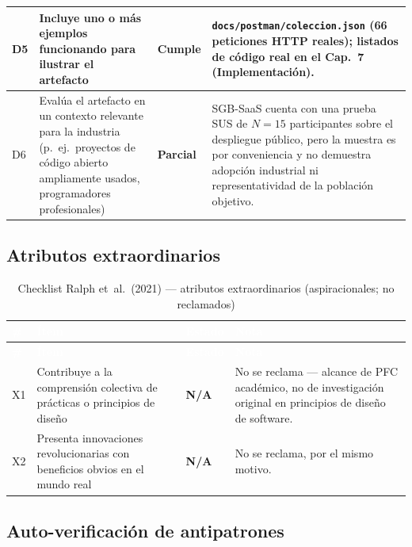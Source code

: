 \begin{center}
\begin{longtable}{|p{0.7cm}|p{4.2cm}|p{1.6cm}|p{7.0cm}|}
\hline
D5 & Incluye uno o más ejemplos funcionando para ilustrar el artefacto & \textbf{Cumple} & \texttt{docs/postman/coleccion.json} (66 peticiones HTTP reales); listados de código real en el Cap.\ 7 (Implementación). \\
\hline
D6 & Evalúa el artefacto en un contexto relevante para la industria (p.\ ej.\ proyectos de código abierto ampliamente usados, programadores profesionales) & \textbf{Parcial} & SGB-SaaS cuenta con una prueba SUS de $N=15$ participantes sobre el despliegue público, pero la muestra es por conveniencia y no demuestra adopción industrial ni representatividad de la población objetivo. \\
\hline
\end{longtable}
\end{center}

\subsection{Atributos extraordinarios}

\begin{center}
\scriptsize
\renewcommand{\arraystretch}{1.15}
\begin{longtable}{|p{0.7cm}|p{4.2cm}|p{1.6cm}|p{7.0cm}|}
\caption{Checklist Ralph et~al.\ (2021) --- atributos extraordinarios
  (aspiracionales; no reclamados)}
\label{tab:anexo-ralph-extraordinarios}\\
\hline
\rowcolor{verdeuteq}
\textcolor{white}{\textbf{\#}} &
\textcolor{white}{\textbf{Ítem}} &
\textcolor{white}{\textbf{Estado}} &
\textcolor{white}{\textbf{Nota}} \\
\hline
\endfirsthead
\hline
\rowcolor{verdeuteq}
\textcolor{white}{\textbf{\#}} &
\textcolor{white}{\textbf{Ítem}} &
\textcolor{white}{\textbf{Estado}} &
\textcolor{white}{\textbf{Nota}} \\
\hline
\endhead
\hline
\endfoot
X1 & Contribuye a la comprensión colectiva de prácticas o principios de diseño & \textbf{N/A} & No se reclama --- alcance de PFC académico, no de investigación original en principios de diseño de software. \\
\hline
X2 & Presenta innovaciones revolucionarias con beneficios obvios en el mundo real & \textbf{N/A} & No se reclama, por el mismo motivo. \\
\hline
\end{longtable}
\end{center}

\subsection{Auto-verificación de antipatrones}

